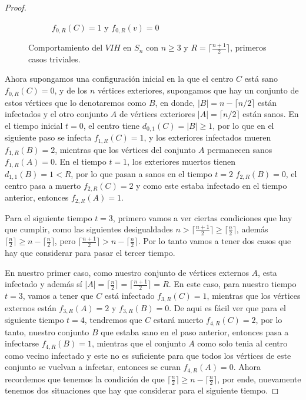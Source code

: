 \documentclass[12pt,titlepage,twoside,openright]{book}
\begin{document}
\begin{proof}
\begin{figure}[h]
\begin{subfigure}[h]{0.7\linewidth}
    \caption{$f_{0,R}(C)=1$ y $f_{0,R}(v)=0$}
    \label{SnyR=VIH(B)}
    \end{subfigure}
    \caption{Comportamiento del $VIH$ en $S_n$ con $n\geq3$ y $R=\lceil \frac{n+1}{2} \rceil$, primeros casos triviales.}
    \label{SnyR=vih}
    \end{figure}
    Ahora supongamos una configuraci\'on inicial en la que el centro $C$ est\'a sano $f_{0,R}(C)=0$, y de los $n$ v\'ertices exteriores, supongamos que hay un conjunto de estos v\'ertices que lo denotaremos como $B$, en donde, $|B|=n-\lceil n/2\rceil$ est\'an infectados y el otro conjunto $A$ de v\'ertices exteriores $|A|=\lceil n/2\rceil$ est\'an sanos. En el tiempo inicial $t=0$, el centro tiene $d_{0,1}(C)=|B|\ge 1$, por lo que en el siguiente paso se infecta $f_{1,R}(C)=1$, y los exteriores infectados mueren $f_{1,R}(B)=2$, mientras que los v\'ertices del conjunto $A$ permanecen sanos $f_{1,R}(A)=0$. En el tiempo $t=1$, los exteriores muertos tienen $d_{1,1}(B)=1<R$, por lo que pasan a sanos en el tiempo $t=2$ $f_{2,R}(B)=0$, el centro pasa a muerto $f_{2,R}(C)=2$ y como este estaba infectado en el tiempo anterior, entonces $f_{2,R}(A)=1$. 
    
    Para el siguiente tiempo $t=3$, primero vamos a ver ciertas condiciones que hay que cumplir, como las siguientes desigualdades $n > \lceil \frac{n+1}{2} \rceil \geq \lceil \frac{n}{2} \rceil$, adem\'as $\lceil \frac{n}{2} \rceil \geq n - \lceil \frac{n}{2} \rceil$, pero $\lceil \frac{n+1}{2} \rceil > n - \lceil \frac{n}{2} \rceil$. Por lo tanto vamos a tener dos casos que hay que considerar para pasar el tercer tiempo.

    En nuestro primer caso, como nuestro conjunto de v\'ertices externos $A$, esta infectado y adem\'as s\'i $|A|= \lceil \frac{n}{2} \rceil = \lceil \frac{n+1}{2} \rceil=R$. En este caso, para nuestro tiempo $t=3$, vamos a tener que $C$ est\'a infectado $f_{3,R}(C)=1$, mientras que los v\'ertices externos est\'an $f_{3,R}(A)=2$ y $f_{3,R}(B)=0$. De aqui es f\'acil ver que para el siguiente tiempo $t=4$, tendremos que $C$ estar\'a muerto $f_{4,R}(C)=2$, por lo tanto, nuestro conjunto $B$ que estaba sano en el paso anterior, entonces pasa a infectarse $f_{4,R}(B)=1$, mientras que el conjunto $A$ como solo tenia al centro como vecino infectado y este no es suficiente para que todos los v\'ertices de este conjunto se vuelvan a infectar, entonces se curan $f_{4,R}(A)=0$. Ahora recordemos que tenemos la condici\'on de que $\lceil \frac{n}{2} \rceil \geq n - \lceil \frac{n}{2} \rceil$, por ende, nuevamente tenemos dos situaciones que hay que considerar para el siguiente tiempo. 


\end{proof}
\end{document}
